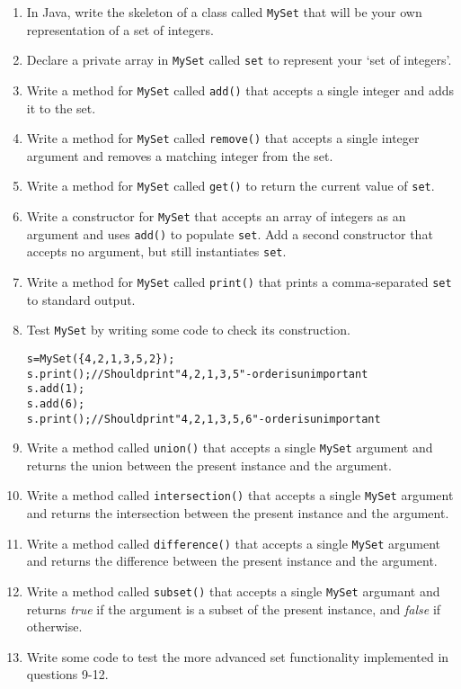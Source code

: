 \documentclass[11pt,a4paper]{report}
\begin{document}
\begin{enumerate}

    \item In Java, write the skeleton of a class called \texttt{MySet} that will be your own representation of a set of integers.

    \item Declare a private array in \texttt{MySet} called \texttt{set} to represent your `set of integers'.

    \item Write a method for \texttt{MySet} called \texttt{add()} that accepts a single integer and adds it to the set.

    \item Write a method for \texttt{MySet} called \texttt{remove()} that accepts a single integer argument and removes a matching integer from the set.

    \item Write a method for \texttt{MySet} called \texttt{get()} to return the current value of \texttt{set}.

    \item Write a constructor for \texttt{MySet} that accepts an array of integers as an argument and uses \texttt{add()} to populate \texttt{set}. Add a second constructor that accepts no argument, but still instantiates \texttt{set}.

    \item Write a method for \texttt{MySet} called \texttt{print()} that prints a comma-separated \texttt{set} to standard output.

    \item Test \texttt{MySet} by writing some code to check its construction.
\begin{alltt}
s = MySet(\{4, 2, 1, 3, 5, 2\});
s.print(); // Should print "4, 2, 1, 3, 5" - order is unimportant
s.add(1);
s.add(6);
s.print(); // Should print "4, 2, 1, 3, 5, 6" - order is unimportant
\end{alltt}
    
    \item Write a method called \texttt{union()} that accepts a single \texttt{MySet} argument and returns the union between the present instance  and the argument.

    \item Write a method called \texttt{intersection()} that accepts a single \texttt{MySet} argument and returns the intersection between the present instance and the argument.

    \item Write a method called \texttt{difference()} that accepts a single \texttt{MySet} argument and returns the difference between the present instance and the argument.

    \item Write a method called \texttt{subset()} that accepts a single \texttt{MySet} argumant and returns \textit{true} if the argument is a subset of the present instance, and \textit{false} if otherwise.

    \item Write some code to test the more advanced set functionality implemented in questions 9-12.
\end{enumerate}
\end{document}
